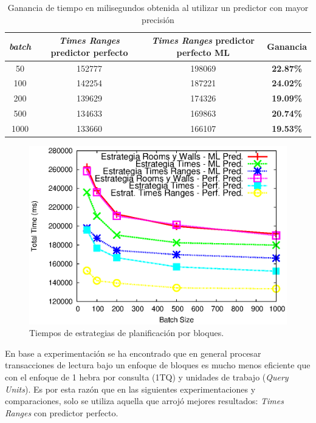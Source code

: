 \begin{table}[htbp]
\caption{Ganancia de tiempo en milisegundos obtenida al utilizar un predictor con mayor precisión}
\begin{center}
\begin{tabular}{|c|c|c|c|}
\hline
\textit{batch} & \textit{Times Ranges} predictor perfecto & \textit{Times Ranges} predictor perfecto ML & Ganancia \\ \hline
50 & 152777 & 198069 & \textbf{22.87\%}   	\\ \hline
100 & 142254 & 187221 & \textbf{24.02\%}  	\\ \hline
200 & 139629 & 174326 & \textbf{19.09\%} 	\\ \hline
500 & 134633 & 169863 & \textbf{20.74\%} 	\\ \hline
1000 & 133660 & 166107 & \textbf{19.53\%} 	\\ \hline
\end{tabular}
\end{center}
\label{ganancia_predictor}
\end{table}

\begin{figure}[tp]
\centering
\includegraphics[scale=.75]{images/scheduler_all_16threads.eps}
\caption{Tiempos de estrategias de planificación por bloques.}
\label{fig:scheduler_all_16threads}
\end{figure}

En base a experimentación se ha encontrado que en general procesar transacciones de lectura bajo un enfoque de bloques \citep{Ye:2007} es mucho menos eficiente que con el enfoque de 1 hebra por consulta (1TQ) y unidades de trabajo (\textit{Query Units}). Es por esta razón que en las siguientes experimentaciones y comparaciones, solo se utiliza aquella que arrojó mejores resultados: \textit{Times Ranges} con predictor perfecto.

